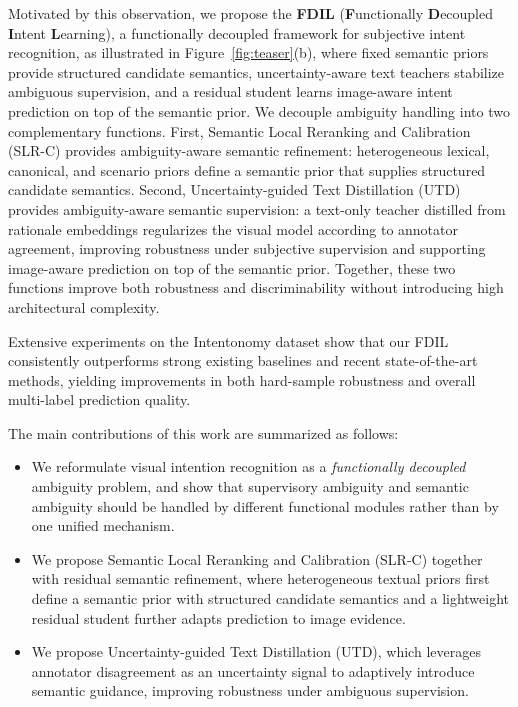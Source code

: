 Motivated by this observation, we propose the \textbf{FDIL} (\textbf{F}unctionally \textbf{D}ecoupled \textbf{I}ntent \textbf{L}earning), a functionally decoupled framework for subjective intent recognition, as illustrated in Figure~\ref{fig:teaser}(b), where fixed semantic priors provide structured candidate semantics, uncertainty-aware text teachers stabilize ambiguous supervision, and a residual student learns image-aware intent prediction on top of the semantic prior.
We decouple ambiguity handling into two complementary functions.
First, Semantic Local Reranking and Calibration (SLR-C) provides ambiguity-aware semantic refinement: heterogeneous lexical, canonical, and scenario priors define a semantic prior that supplies structured candidate semantics.
Second, Uncertainty-guided Text Distillation (UTD) provides ambiguity-aware semantic supervision: a text-only teacher distilled from rationale embeddings regularizes the visual model according to annotator agreement, improving robustness under subjective supervision and supporting image-aware prediction on top of the semantic prior.
Together, these two functions improve both robustness and discriminability without introducing high architectural complexity.

Extensive experiments on the Intentonomy dataset show that our FDIL consistently outperforms strong existing baselines and recent state-of-the-art methods, yielding improvements in both hard-sample robustness and overall multi-label prediction quality.

The main contributions of this work are summarized as follows:
\begin{itemize}
    \item We reformulate visual intention recognition as a \emph{functionally decoupled} ambiguity problem, and show that supervisory ambiguity and semantic ambiguity should be handled by different functional modules rather than by one unified mechanism.
    \item We propose Semantic Local Reranking and Calibration (SLR-C) together with residual semantic refinement, where heterogeneous textual priors first define a semantic prior with structured candidate semantics and a lightweight residual student further adapts prediction to image evidence.
    \item We propose Uncertainty-guided Text Distillation (UTD), which leverages annotator disagreement as an uncertainty signal to adaptively introduce semantic guidance, improving robustness under ambiguous supervision.
\end{itemize}

